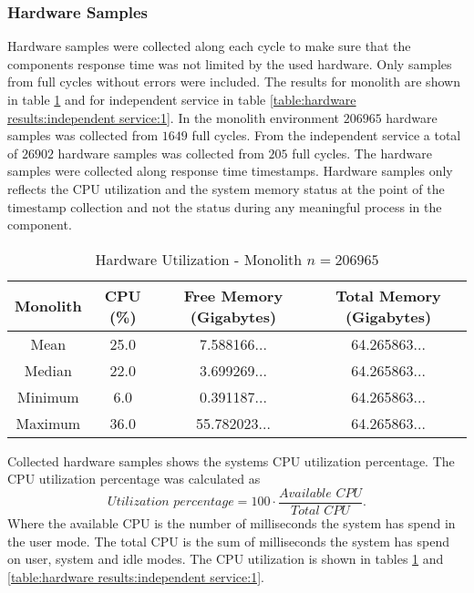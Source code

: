 \subsubsection{Hardware Samples}
Hardware samples were collected along each cycle to make sure that the components response time was not limited by the used hardware.
Only samples from full cycles without errors were included.
The results for monolith are shown in table \ref{table:hardware results:monolith:1} and for independent service in table \ref{table:hardware results:independent service:1}.
In the monolith environment $206965$ hardware samples was collected from $1649$ full cycles.
From the independent service a total of $26902$ hardware samples was collected from $205$ full cycles.
The hardware samples were collected along response time timestamps.
Hardware samples only reflects the CPU utilization and the system memory status at the point of the timestamp collection and not the status during any meaningful process in the component.

\begin{table}[ht!]
    \begin{tabular}{|c|c|c|c|} 
        \hline
        Monolith
        & CPU (\%)
        & Free Memory (Gigabytes)
        & Total Memory (Gigabytes) \\ [0.5ex] 
        
        \hline\hline
        Mean
        & 25.0
        & 7.588166...
        & 64.265863... \\ 
        
        Median
        & 22.0
        & 3.699269...
        & 64.265863... \\ 

        Minimum
        & 6.0
        & 0.391187...
        & 64.265863... \\ 
        
        Maximum
        & 36.0
        & 55.782023...
        & 64.265863... \\
        \hline
    \end{tabular}
    \caption{Hardware Utilization - Monolith $n=206 965$}
    \label{table:hardware results:monolith:1}
\end{table}

Collected hardware samples shows the systems CPU utilization percentage.
The CPU utilization percentage was calculated as
\[
\textit{Utilization percentage} = 100 \cdot \frac{\textit{Available CPU}}{\textit{Total CPU}}
.\]
Where the available CPU is the number of milliseconds the system has spend in the user mode.
The total CPU is the sum of milliseconds the system has spend on user, system and idle modes. The CPU utilization is shown in tables \ref{table:hardware results:monolith:1} and \ref{table:hardware results:independent service:1}.


